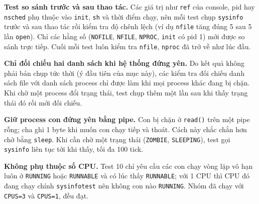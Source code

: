 \item \textbf{Test so sánh trước và sau thao tác.} Các giá trị như \texttt{ref} của console, pid hay \texttt{nsched} phụ thuộc vào \texttt{init}, \texttt{sh} và thời điểm chạy, nên mỗi test chụp \texttt{sysinfo} trước và sau thao tác rồi kiểm tra độ chênh lệch (ví dụ \texttt{nfile} tăng đúng 5 sau 5 lần \texttt{open}). Chỉ các hằng số (\texttt{NOFILE}, \texttt{NFILE}, \texttt{NPROC}, \texttt{init} có pid 1) mới được so sánh trực tiếp. Cuối mỗi test luôn kiểm tra \texttt{nfile}, \texttt{nproc} đã trở về như lúc đầu.

\item \textbf{Chỉ đối chiếu hai danh sách khi hệ thống đứng yên.} Do kết quả không phải bản chụp tức thời (ý đầu tiên của mục này), các kiểm tra đối chiếu danh sách file với danh sách process chỉ được làm khi mọi process khác đang bị chặn. Khi chờ một process đổi trạng thái, test chụp thêm một lần sau khi thấy trạng thái đó rồi mới đối chiếu.

\item \textbf{Giữ process con đứng yên bằng pipe.} Con bị chặn ở \texttt{read()} trên một pipe rỗng; cha ghi 1 byte khi muốn con chạy tiếp và thoát. Cách này chắc chắn hơn chờ bằng \texttt{sleep}. Khi cần chờ một trạng thái (\texttt{ZOMBIE}, \texttt{SLEEPING}), test gọi \texttt{sysinfo} liên tục tới khi thấy, tối đa 100 tick.

\item \textbf{Không phụ thuộc số CPU.} Test 10 chỉ yêu cầu các con chạy vòng lặp vô hạn luôn ở \texttt{RUNNING} hoặc \texttt{RUNNABLE} và có lúc thấy \texttt{RUNNABLE}; với 1 CPU thì CPU đó đang chạy chính \texttt{sysinfotest} nên không con nào \texttt{RUNNING}. Nhóm đã chạy với \texttt{CPUS=3} và \texttt{CPUS=1}, đều đạt.
